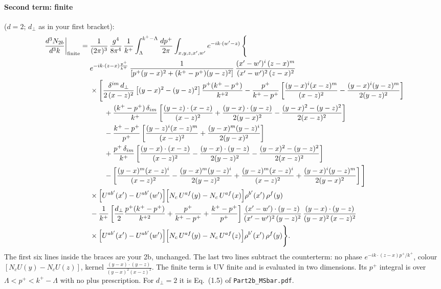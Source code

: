 \documentclass[10pt]{article}
\numberwithin{equation}{section}
\begin{document}
\paragraph{Second term: finite} ($d=2$; $d_\perp$ as in your first bracket):
\begin{align}
\frac{d^{3}N_{2b}}{d^{3}k}\bigg|_{\rm finite}={}&\frac{1}{(2\pi)^{3}}\,\frac{g^{4}}{8\pi^{4}}\,\frac{1}{k^{+}}\int_{\Lambda}^{k^{+}-\Lambda}\frac{dp^{+}}{2\pi}\int_{x,y,z,x',w'}e^{-ik\cdot(w'-z)}\,\Bigg\{\notag\\
&e^{-ik\cdot(z-x)\frac{p^{+}}{k^{+}}}\,\frac{1}{\left[p^{+}(y-x)^{2}+(k^{+}-p^{+})(y-z)^{2}\right]}\,\frac{(x'-w')^{i}\,(z-x)^{m}}{(x'-w')^{2}\,(z-x)^{2}}\notag\\
&\times\Bigg[\frac{\delta^{im}\,d_{\perp}}{2\,(x-z)^{2}}\left[(y-x)^{2}-(y-z)^{2}\right]\frac{p^{+}(k^{+}-p^{+})}{k^{+2}}
-\frac{p^{+}}{k^{+}-p^{+}}\left[\frac{(y-x)^{i}(x-z)^{m}}{(x-z)^{2}}-\frac{(y-x)^{i}(y-z)^{m}}{2(y-z)^{2}}\right]\notag\\
&\qquad+\frac{(k^{+}-p^{+})\,\delta_{im}}{k^{+}}\left[\frac{(y-z)\cdot(x-z)}{(x-z)^{2}}+\frac{(y-x)\cdot(y-z)}{2(y-x)^{2}}-\frac{(y-x)^{2}-(y-z)^{2}}{2(x-z)^{2}}\right]\notag\\
&\qquad-\frac{k^{+}-p^{+}}{p^{+}}\left[\frac{(y-z)^{i}(x-z)^{m}}{(x-z)^{2}}+\frac{(y-x)^{m}(y-z)^{i}}{2(y-x)^{2}}\right]\notag\\
&\qquad+\frac{p^{+}\,\delta_{im}}{k^{+}}\left[\frac{(y-x)\cdot(x-z)}{(x-z)^{2}}-\frac{(y-x)\cdot(y-z)}{2(y-z)^{2}}-\frac{(y-x)^{2}-(y-z)^{2}}{2(x-z)^{2}}\right]\notag\\
&\qquad-\left[\frac{(y-x)^{m}(x-z)^{i}}{(x-z)^{2}}-\frac{(y-x)^{m}(y-z)^{i}}{2(y-z)^{2}}+\frac{(y-z)^{m}(x-z)^{i}}{(x-z)^{2}}+\frac{(y-x)^{i}(y-z)^{m}}{2(y-x)^{2}}\right]\Bigg]\notag\\
&\times\Big[U^{ab'}(x')-U^{ab'}(w')\Big]\Big[N_{c}\,U^{af}(y)-N_{c}\,U^{af}(x)\Big]\rho^{b'}(x')\,\rho^{f}(y)\notag\\
&-\frac{1}{k^{+}}\left[\frac{d_\perp}{2}\frac{p^{+}(k^{+}-p^{+})}{k^{+2}}+\frac{p^{+}}{k^{+}-p^{+}}+\frac{k^{+}-p^{+}}{p^{+}}\right]
\frac{(x'-w')\cdot(y-z)}{(x'-w')^{2}\,(y-z)^{2}}\,\frac{(y-x)\cdot(y-z)}{(y-x)^{2}\,(x-z)^{2}}\notag\\
&\times\Big[U^{ab'}(x')-U^{ab'}(w')\Big]\Big[N_{c}\,U^{af}(y)-N_{c}\,U^{af}(z)\Big]\rho^{b'}(x')\,\rho^{f}(y)\Bigg\}.
\label{eq:fin}
\end{align}
The first six lines inside the braces are your 2b, unchanged. The last two lines subtract the counterterm: no phase $e^{-ik\cdot(z-x)p^+/k^+}$, colour $[N_cU(y)-N_cU(z)]$, kernel $\frac{(y-x)\cdot(y-z)}{(y-x)^2(x-z)^2}$. The finite term is UV finite and is evaluated in two dimensions. Its $p^+$ integral is over $\Lambda<p^+<k^+-\Lambda$ with no plus prescription. For $d_\perp=2$ it is Eq.~(1.5) of \texttt{Part2b\_MSbar.pdf}.
\end{document}
